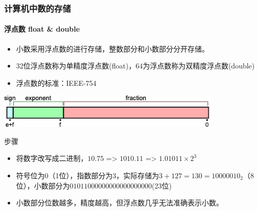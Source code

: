 \documentclass[10pt]{beamer}
\begin{document}
\begin{frame}
\frametitle{计算机中数的存储}
\framesubtitle{浮点数 float \& double}
\begin{itemize}
    \item 小数采用浮点数的进行存储，整数部分和小数部分分开存储。
    \item 32位浮点数称为单精度浮点数(float)，64为浮点数称为双精度浮点数(double)
    \item 浮点数的标准：IEEE-754
\end{itemize}

\begin{table}
    \includegraphics[width=0.8\textwidth]{figures/float.jpg}
\end{table}

\begin{block}{步骤}
    \begin{itemize}
        \item 将数字改写成二进制，$10.75$ => $1010.11$ => $1.01011\times 2^{3}$
        \item 符号位为$0$（1位），指数部分为$3$，实际存储为$3+127=130=10000010_2$（8位），小数部分为$01011000000000000000000$(23位)
        \item 小数部分位数越多，精度越高，但浮点数几乎无法准确表示小数。
    \end{itemize}
\end{block}
\end{frame}
\end{document}
